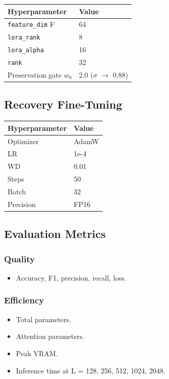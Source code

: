 \begin{table}[H]
\centering
\small
\begin{tabular}{ll}
\toprule
\textbf{Hyperparameter} & \textbf{Value} \\
\midrule
\texttt{feature\_dim} F & 64 \\
\texttt{lora\_rank} & 8 \\
\texttt{lora\_alpha} & 16 \\
\texttt{rank} & 32 \\
Preservation gate $w_0$ & 2.0 ($\sigma$ $\to$ 0.88) \\
\bottomrule
\end{tabular}
\end{table}

\subsection{Recovery Fine-Tuning}

\begin{table}[H]
\centering
\small
\begin{tabular}{ll}
\toprule
\textbf{Hyperparameter} & \textbf{Value} \\
\midrule
Optimizer & AdamW \\
LR & 1e-4 \\
WD & 0.01 \\
Steps & 50 \\
Batch & 32 \\
Precision & FP16 \\
\bottomrule
\end{tabular}
\end{table}

\subsection{Evaluation Metrics}

\subsubsection{Quality}
\begin{itemize}
\item Accuracy, F1, precision, recall, loss.

\end{itemize}
\subsubsection{Efficiency}
\begin{itemize}
\item Total parameters.
\item Attention parameters.
\item Peak VRAM.
\item Inference time at L = 128, 256, 512, 1024, 2048.

\end{itemize}
